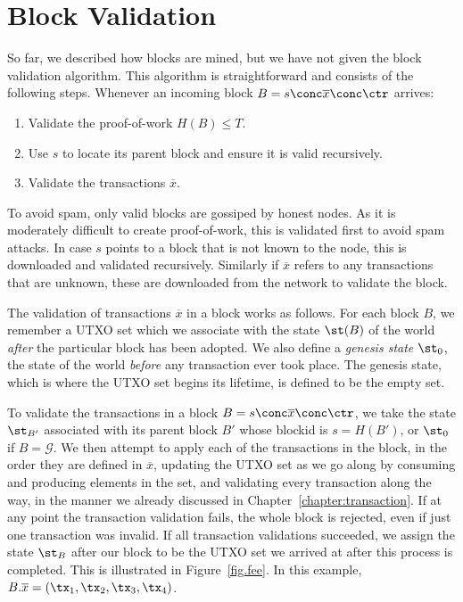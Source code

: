 \section{Block Validation}

So far, we described how blocks are mined, but we have not given the block validation algorithm.
This algorithm is straightforward and consists of the following steps. Whenever an incoming
block $B = s \conc \overline{x} \conc \ctr$ arrives:

\begin{enumerate}
    \item Validate the proof-of-work $H(B) \leq T$.
    \item Use $s$ to locate its parent block and ensure it is valid recursively.
    \item Validate the transactions $\overline{x}$.
\end{enumerate}

To avoid spam, only valid blocks are gossiped by honest nodes. As it is moderately difficult to
create proof-of-work, this is validated first to avoid spam attacks. In case $s$ points to a block
that is not known to the node, this is downloaded and validated recursively. Similarly if
$\overline{x}$ refers to any transactions that are unknown, these are downloaded from the network
to validate the block.

The validation of transactions
$\overline{x}$ in a block works as follows. For each block $B$, we remember a UTXO set which we
associate with the state $\st(B)$ of the world \emph{after} the particular block has been adopted.
We also define a \emph{genesis state} $\st_0$, the state of the world \emph{before}
any transaction ever
took place. The genesis state, which is where the UTXO set begins its lifetime, is defined to be the
empty set.

To validate the transactions in a block $B = s \conc \overline{x} \conc \ctr$, we take the state
$\st_{B'}$ associated with
its parent block $B'$ whose blockid is $s = H(B')$, or $\st_0$ if $B = \mathcal{G}$.
We then attempt to apply each of the transactions in the block, in the order
they are defined in $\overline{x}$, updating the UTXO set as we go along by consuming
and producing elements in the set, and validating
every transaction along the way, in the manner we already discussed in Chapter~\ref{chapter:transaction}.
If at any point the transaction validation fails, the whole block is rejected,
even if just one transaction was invalid. If all transaction validations succeeded,
we assign the state $\st_B$ after our block to be the UTXO set we arrived at after
this process is completed. This is illustrated in Figure~\ref{fig.fee}.
In this example, $B.\overline{x} = (\tx_1, \tx_2, \tx_3, \tx_4)$.

